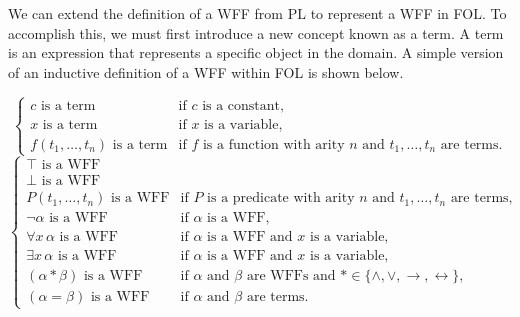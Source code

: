 \begin{table}[h!]
    \centering
    \caption{Quantifiers in First-Order Logic}
    \label{tab:quant}
\end{table}

We can extend the definition of a \gls{WFF} from \gls{PL} to represent a \gls{WFF} in \gls{FOL}. To accomplish this, we must first introduce a new concept known as a term. A term is an expression that represents a specific object in the domain. A simple version of an inductive definition of a \gls{WFF} within \gls{FOL} is shown below. 



\[
\left\{
\begin{array}{ll}
c \text{ is a term} & \text{if } c \text{ is a constant,} \\
x \text{ is a term} & \text{if } x \text{ is a variable,} \\
f(t_1, \dots, t_n) \text{ is a term} & \text{if } f \text{ is a function with arity } n \text{ and } t_1, \dots, t_n \text{ are terms.}
\end{array}
\right.
\]
\[
\left\{
\begin{array}{ll}
\top \text{ is a WFF} & \\
\bot \text{ is a WFF} & \\
P(t_1, \dots, t_n) \text{ is a WFF} & \text{if } P \text{ is a predicate with arity } n \text{ and } t_1, \dots, t_n \text{ are terms,} \\
\neg \alpha \text{ is a WFF} & \text{if } \alpha \text{ is a WFF,} \\
\forall x \, \alpha \text{ is a WFF} & \text{if } \alpha \text{ is a WFF and } x \text{ is a variable,} \\
\exists x \, \alpha \text{ is a WFF} & \text{if } \alpha \text{ is a WFF and } x \text{ is a variable,} \\
(\alpha * \beta) \text{ is a WFF} & \text{if } \alpha \text{ and } \beta \text{ are WFFs and } * \in \{\land, \lor, \rightarrow, \leftrightarrow\}, \\
(\alpha = \beta) \text{ is a WFF} & \text{if } \alpha \text{ and } \beta \text{ are terms.}
\end{array}
\right.
\]


